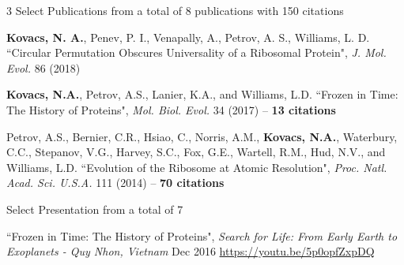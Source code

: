 

\begin{cventries}

  \cventry
  	{3 Select Publications from a total of 8 publications with 150 citations} %
    {} %
    {} %
    {} %
    {\begin{cvitems}
    \item {\bf Kovacs, N. A.}, Penev, P. I., Venapally, A., Petrov, A. S., Williams, L. D. ``Circular Permutation Obscures Universality of a Ribosomal Protein", \textit{J. Mol. Evol.} 86 (2018)
    \item {\bf Kovacs, N.A.}, Petrov, A.S., Lanier, K.A., and Williams, L.D. ``Frozen in Time: The History of Proteins", \textit{Mol. Biol. Evol.} 34 (2017) -- {\bf 13 citations}
    \item Petrov, A.S., Bernier, C.R., Hsiao, C., Norris, A.M., {\bf Kovacs, N.A.}, Waterbury, C.C., Stepanov, V.G., Harvey, S.C., Fox, G.E., Wartell, R.M., Hud, N.V., and Williams, L.D. ``Evolution of the Ribosome at Atomic Resolution", \textit{Proc. Natl. Acad. Sci. U.S.A.} 111 (2014) -- {\bf 70 citations}
    \end{cvitems}
    }
    
  \cventry
  	{Select Presentation from a total of 7} %
    {} %
    {} %
    {} %
    {\begin{cvitems}
    \item ``Frozen in Time: The History of Proteins", {\it Search for Life: From Early Earth to Exoplanets - Quy Nhon, Vietnam} Dec 2016 \href{https://youtu.be/5p0opfZxpDQ}{https://youtu.be/5p0opfZxpDQ}
    \end{cvitems}
    }
    
\vspace{-1em}

\end{cventries}
